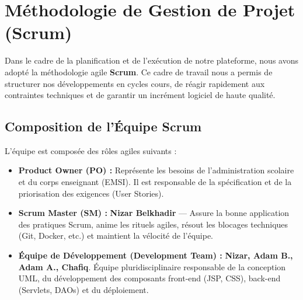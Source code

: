 \documentclass[12pt,a4paper]{article}
\begin{document}
\section{Méthodologie de Gestion de Projet (Scrum)}
Dans le cadre de la planification et de l'exécution de notre plateforme, nous avons adopté la méthodologie agile \textbf{Scrum}. Ce cadre de travail nous a permis de structurer nos développements en cycles cours, de réagir rapidement aux contraintes techniques et de garantir un incrément logiciel de haute qualité.

\subsection{Composition de l'Équipe Scrum}
L'équipe est composée des rôles agiles suivants :
\begin{itemize}
    \item \textbf{Product Owner (PO) :} Représente les besoins de l'administration scolaire et du corps enseignant (EMSI). Il est responsable de la spécification et de la priorisation des exigences (User Stories).
    \item \textbf{Scrum Master (SM) :} \textbf{Nizar Belkhadir} — Assure la bonne application des pratiques Scrum, anime les rituels agiles, résout les blocages techniques (Git, Docker, etc.) et maintient la vélocité de l'équipe.
    \item \textbf{Équipe de Développement (Development Team) :} \textbf{Nizar, Adam B., Adam A., Chafiq}. Équipe pluridisciplinaire responsable de la conception UML, du développement des composants front-end (JSP, CSS), back-end (Servlets, DAOs) et du déploiement.
\end{itemize}
\end{document}
